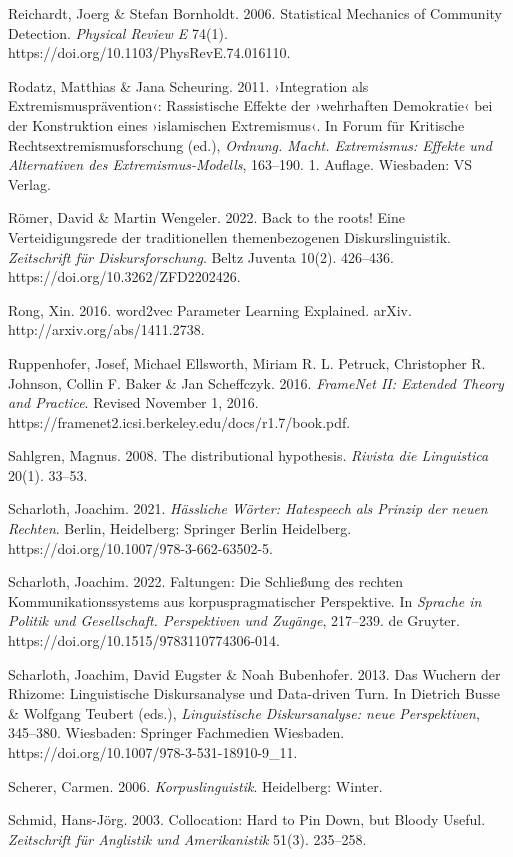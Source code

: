 Reichardt, Joerg \& Stefan Bornholdt. 2006. Statistical Mechanics of Community Detection. \emph{Physical Review E} 74(1). https://doi.org/10.1103/PhysRevE.74.016110.

Rodatz, Matthias \& Jana Scheuring. 2011. ›Integration als Extremismusprävention‹: Rassistische Effekte der ›wehrhaften Demokratie‹ bei der Konstruktion eines ›islamischen Extremismus‹. In Forum für Kritische Rechtsextremismusforschung (ed.), \emph{Ordnung. Macht. Extremismus: Effekte und Alternativen des Extremismus-Modells}, 163--190. 1. Auflage. Wiesbaden: VS Verlag.

Römer, David \& Martin Wengeler. 2022. Back to the roots! Eine Verteidigungsrede der traditionellen themenbezogenen Diskurslinguistik. \emph{Zeitschrift für Diskursforschung}. Beltz Juventa 10(2). 426--436. https://doi.org/10.3262/ZFD2202426.

Rong, Xin. 2016. word2vec Parameter Learning Explained. arXiv. http://arxiv.org/abs/1411.2738.

Ruppenhofer, Josef, Michael Ellsworth, Miriam R. L. Petruck, Christopher R. Johnson, Collin F. Baker \& Jan Scheffczyk. 2016. \emph{FrameNet II: Extended Theory and Practice}. Revised November 1, 2016. https://framenet2.icsi.berkeley.edu/docs/r1.7/book.pdf.

Sahlgren, Magnus. 2008. The distributional hypothesis. \emph{Rivista die Linguistica} 20(1). 33--53.

Scharloth, Joachim. 2021. \emph{Hässliche Wörter: Hatespeech als Prinzip der neuen Rechten}. Berlin, Heidelberg: Springer Berlin Heidelberg. https://doi.org/10.1007/978-3-662-63502-5.

Scharloth, Joachim. 2022. Faltungen: Die Schließung des rechten Kommunikationssystems aus korpuspragmatischer Perspektive. In \emph{Sprache in Politik und Gesellschaft. Perspektiven und Zugänge}, 217--239. de Gruyter. https://doi.org/10.1515/9783110774306-014.

Scharloth, Joachim, David Eugster \& Noah Bubenhofer. 2013. Das Wuchern der Rhizome: Linguistische Diskursanalyse und Data-driven Turn. In Dietrich Busse \& Wolfgang Teubert (eds.), \emph{Linguistische Diskursanalyse: neue Perspektiven}, 345--380. Wiesbaden: Springer Fachmedien Wiesbaden. https://doi.org/10.1007/978-3-531-18910-9\_11.

Scherer, Carmen. 2006. \emph{Korpuslinguistik}. Heidelberg: Winter.

Schmid, Hans-Jörg. 2003. Collocation: Hard to Pin Down, but Bloody Useful. \emph{Zeitschrift für Anglistik und Amerikanistik} 51(3). 235--258.

